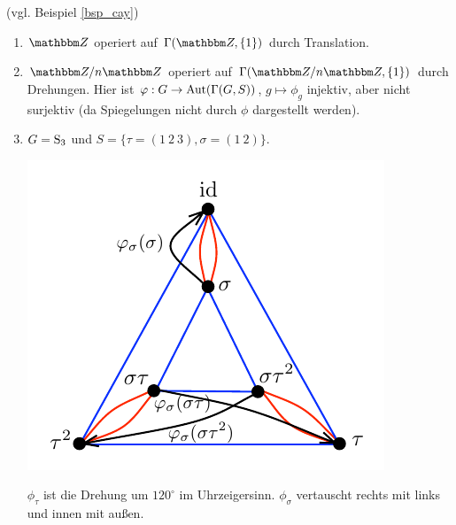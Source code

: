 \documentclass[a4paper, 12pt, twoside]{article}
\begin{document}
\BSP (vgl. Beispiel \ref{bsp_cay})
\begin{enumerate}
\item $\ZZ$ operiert auf $\GR(\ZZ,\{1\})$ durch Translation.
\item $\ZZ/n\ZZ$ operiert auf $\GR(\ZZ/n\ZZ,\{1\})$ durch
Drehungen. Hier ist $\varphi:G\rightarrow\mathrm{Aut}(\Gamma(G,S))$, $g\mapsto\phi_g$
injektiv, aber nicht surjektiv (da Spiegelungen nicht durch
$\phi$ dargestellt werden).
\item $G=\mathrm{S}_3$ und $S=\{\tau=(1\ 2\ 3), \sigma=(1\ 2)\}$.
\begin{center}
	\includegraphics{grugraImages/S3aktion}
\end{center}
$\phi_{\tau}$ ist die Drehung um $120^{\circ}$ im
Uhrzeigersinn. $\phi_{\sigma}$ vertauscht rechts mit links und
innen mit außen.
\end{enumerate}
\end{document}
